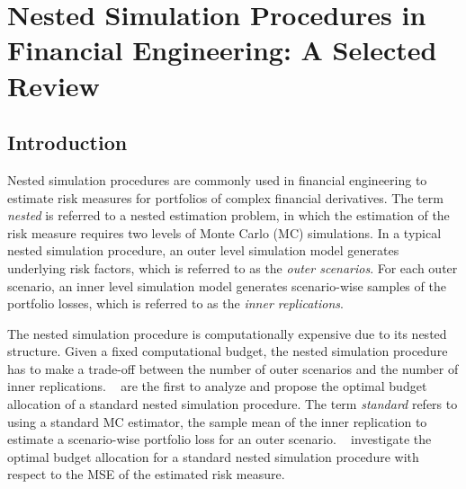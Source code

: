 \chapter{Nested Simulation Procedures in Financial Engineering: A Selected Review} \label{chap:project1}


\section{Introduction}

Nested simulation procedures are commonly used in financial engineering to estimate risk measures for portfolios of complex financial derivatives. 
The term \textit{nested} is referred to a nested estimation problem, in which the estimation of the risk measure requires two levels of Monte Carlo (MC) simulations.
In a typical nested simulation procedure, an outer level simulation model generates underlying risk factors, which is referred to as the \textit{outer scenarios}.
For each outer scenario, an inner level simulation model generates scenario-wise samples of the portfolio losses, which is referred to as the \textit{inner replications}.

The nested simulation procedure is computationally expensive due to its nested structure. 
Given a fixed computational budget, the nested simulation procedure has to make a trade-off between the number of outer scenarios and the number of inner replications.
~\cite{gordy2010nested} are the first to analyze and propose the optimal budget allocation of a standard nested simulation procedure. 
The term \textit{standard} refers to using a standard MC estimator, the sample mean of the inner replication to estimate a scenario-wise portfolio loss for an outer scenario.
~\cite{gordy2010nested} investigate the optimal budget allocation for a standard nested simulation procedure with respect to the MSE of the estimated risk measure.

